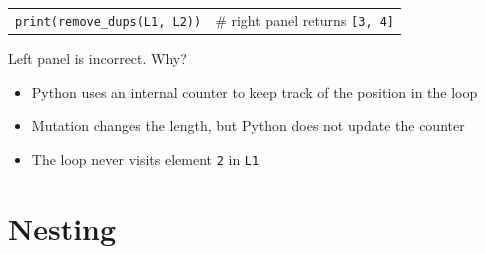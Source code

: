 \documentclass[t,handout,9pt]{beamer}
\begin{document}
\begin{frame}
\begin{table}[]
\begin{flushleft}
\begin{tabular}{ll}
\texttt{print(remove\_dups(L1, L2))} & \# right panel returns \texttt{[3, 4]} \\
\end{tabular}
\end{flushleft}
\end{table}
\vfill
Left panel is incorrect. Why?
\begin{itemize}
	\item Python uses an internal counter to keep track of the position in the loop
	\item Mutation changes the length, but Python does not update the counter
	\item The loop never visits element \texttt{2} in \texttt{L1}
\end{itemize}
\vfill
\end{frame}
%
\section{Nesting}
\end{document}
